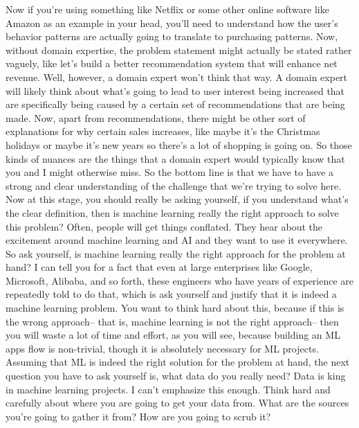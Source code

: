     Now if you're using something like Netflix
    or some other online software like Amazon as an example in your head,
    you'll need to understand how the user's behavior patterns are actually going
    to translate to purchasing patterns.
    Now, without domain expertise, the problem statement
    might actually be stated rather vaguely, like let's build
    a better recommendation system that will enhance net revenue.
    Well, however, a domain expert won't think that way.
    A domain expert will likely think about what's
    going to lead to user interest being increased that are specifically
    being caused by a certain set of recommendations that are being made.
    Now, apart from recommendations, there might
    be other sort of explanations for why certain sales increases, like maybe
    it's the Christmas holidays or maybe it's new years so there's
    a lot of shopping is going on.
    So those kinds of nuances are the things that a domain expert would typically
    know that you and I might otherwise miss.
    So the bottom line is that we have to have
    a strong and clear understanding of the challenge
    that we're trying to solve here.
    Now at this stage, you should really be asking yourself,
    if you understand what's the clear definition,
    then is machine learning really the right approach to solve this problem?
    Often, people will get things conflated.
    They hear about the excitement around machine learning and AI
    and they want to use it everywhere.
    So ask yourself, is machine learning really the right approach
    for the problem at hand?
    I can tell you for a fact that even at large enterprises like Google,
    Microsoft, Alibaba, and so forth, these engineers who have years of experience
    are repeatedly told to do that, which is ask yourself and justify that it
    is indeed a machine learning problem.
    You want to think hard about this, because if this
    is the wrong approach-- that is, machine learning is not the right approach--
    then you will waste a lot of time and effort, as you will see,
    because building an ML apps flow is non-trivial, though it is absolutely
    necessary for ML projects.
    Assuming that ML is indeed the right solution for the problem at hand,
    the next question you have to ask yourself
    is, what data do you really need?
    Data is king in machine learning projects.
    I can't emphasize this enough.
    Think hard and carefully about where you are going to get your data from.
    What are the sources you're going to gather it from?
    How are you going to scrub it?
